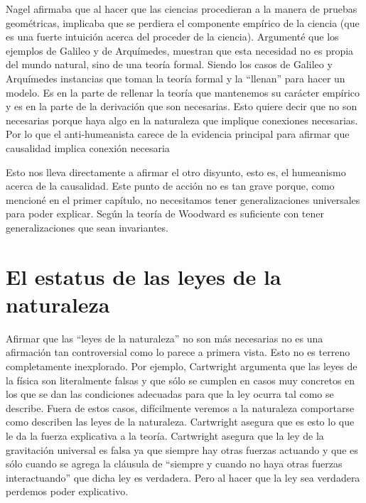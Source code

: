 
Nagel afirmaba que al hacer que las ciencias procedieran a la manera de pruebas geométricas, implicaba que se perdiera el componente empírico de la ciencia (que es una fuerte intuición acerca del proceder de la ciencia). Argumenté que los ejemplos de Galileo y de Arquímedes, muestran que esta necesidad no es propia del mundo natural, sino de una teoría formal. Siendo los casos de Galileo y Arquímedes instancias que toman la teoría formal y la ``llenan'' para hacer un modelo. Es en la parte de rellenar la teoría que mantenemos su carácter empírico y es en la parte de la derivación que son necesarias. Esto quiere decir que no son necesarias porque haya algo en la naturaleza que implique conexiones necesarias. Por lo que el anti-humeanista carece de la evidencia principal para afirmar que causalidad implica conexión necesaria

Esto nos lleva directamente a afirmar el otro disyunto, esto es, el humeanismo acerca de la causalidad. Este punto de acción no es tan grave porque, como mencioné en el primer capítulo, no necesitamos tener generalizaciones universales para poder explicar. Según la teoría de Woodward es suficiente con tener generalizaciones que sean invariantes.

\section{El estatus de las leyes de la naturaleza}

\noindent Afirmar que las ``leyes de la naturaleza'' no son más necesarias no es una afirmación tan controversial como lo parece a primera vista. Esto no es terreno completamente inexplorado. Por ejemplo, Cartwright \citeyear{Cartwright1983} argumenta que las leyes de la física son literalmente falsas y que sólo se cumplen en casos muy concretos en los que se dan las condiciones adecuadas para que la ley ocurra tal como se describe. Fuera de estos casos, difícilmente veremos a la naturaleza comportarse como describen las leyes de la naturaleza. Cartwright asegura que es esto lo que le da la fuerza explicativa a la teoría. Cartwright asegura que la ley de la gravitación universal es falsa ya que siempre hay otras fuerzas actuando y que es sólo cuando se agrega la cláusula de ``siempre y cuando no haya otras fuerzas interactuando'' que dicha ley es verdadera. Pero al hacer que la ley sea verdadera perdemos poder explicativo.

